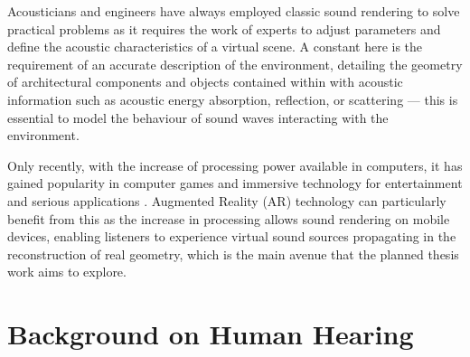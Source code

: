 Acousticians and engineers have always employed classic sound rendering to solve practical problems as it requires the work of experts to adjust parameters and define the acoustic characteristics of a virtual scene. A constant here is the requirement of an accurate description of the environment, detailing the geometry of architectural components and objects contained within with acoustic information such as acoustic energy absorption, reflection, or scattering --- this is essential to model the behaviour of sound waves interacting with the environment. \par
Only recently, with the increase of processing power available in computers, it has gained popularity in computer games and immersive technology for entertainment and serious applications \citep{zhang18}. Augmented Reality (AR) technology can particularly benefit from this as the increase in processing allows sound rendering on mobile devices, enabling listeners to experience virtual sound sources propagating in the reconstruction of real geometry, which is the main avenue that the planned thesis work aims to explore. \par

\section{Background on Human Hearing}
